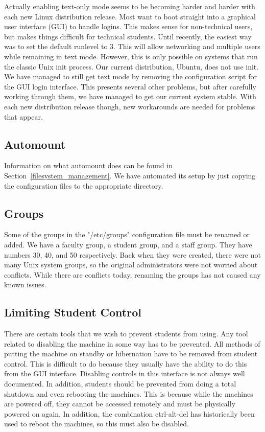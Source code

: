 Actually enabling text-only mode seems to be becoming harder and harder with each new Linux distribution release.  Most want to boot straight into a graphical user interface (GUI) to handle logins.  This makes sense for non-technical users, but makes things difficult for technical students.  Until recently, the easiest way was to set the default runlevel to 3.  This will allow networking and multiple users while remaining in text mode.  However, this is only possible on systems that run the classic Unix init process.  Our current distribution, Ubuntu, does not use init.  We have managed to still get text mode by removing the configuration script for the GUI login interface.  This presents several other problems, but after carefully working through them, we have managed to get our current system stable.  With each new distribution release though, new workarounds are needed for problems that appear.  

\subsection{Automount}
Information on what automount does can be found in Section~\ref{filesystem_management}.  We have automated its setup by just copying the configuration files to the appropriate directory.  

\subsection{Groups}
Some of the groups in the "/etc/groups" configuration file must be renamed or added.  We have a faculty group, a student group, and a staff group.  They have numbers 30, 40, and 50 respectively.  Back when they were created, there were not many Unix system groups, so the original administrators were not worried about conflicts.  While there are conflicts today, renaming the groups has not caused any known issues.  

\subsection{Limiting Student Control}
There are certain tools that we wish to prevent students from using.  Any tool related to disabling the machine in some way has to be prevented.  All methods of putting the machine on standby or hibernation have to be removed from student control.  This is difficult to do because they usually have the ability to do this from the GUI interface.  Disabling controls in this interface is not always well documented.  In addition, students should be prevented from doing a total shutdown and even rebooting the machines.  This is because while the machines are powered off, they cannot be accessed remotely and must be physically powered on again.  In addition, the combination ctrl-alt-del has historically been used to reboot the machines, so this must also be disabled.  

